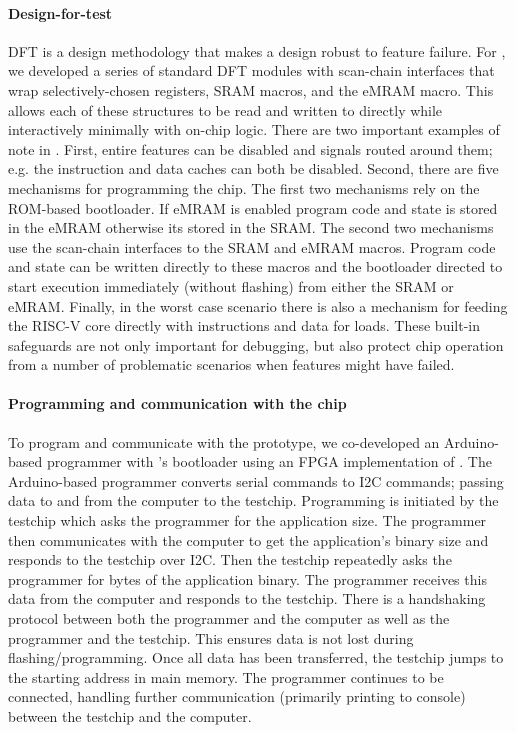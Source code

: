 \paragraph{Design-for-test}
DFT is a design methodology that makes a design robust to feature failure.
% 
For \msilicon, we developed a series of standard DFT modules with scan-chain interfaces that wrap selectively-chosen registers, SRAM macros, and the eMRAM macro.
% 
This allows each of these structures to be read and written to directly while interactively minimally with on-chip logic.
% 
There are two important examples of note in \msilicon.
% 
First, entire features can be disabled and signals routed around them; e.g. the instruction and data caches can both be disabled.
% 
Second, there are five mechanisms for programming the chip.
% 
The first two mechanisms rely on the ROM-based bootloader.
% 
If eMRAM is enabled program code and state is stored in the eMRAM otherwise its stored in the SRAM.
% 
The second two mechanisms use the scan-chain interfaces to the SRAM and eMRAM macros.
% 
Program code and state can be written directly to these macros and the bootloader directed to start execution immediately (without flashing) from either the SRAM or eMRAM.
% 
Finally, in the worst case scenario there is also a mechanism for feeding the RISC-V core directly with instructions and data for loads.
% 
These built-in safeguards are not only important for debugging, but also protect chip operation from a number of problematic scenarios when features might have failed.

\paragraph{Programming and communication with the chip} 
To program and communicate with the \msilicon prototype, we co-developed an Arduino-based programmer with \msilicon's bootloader using an FPGA implementation of \msilicon.
% 
The Arduino-based programmer converts serial commands to I2C commands; passing data to and from the computer to the testchip.
% 
Programming is initiated by the testchip which asks the programmer for the application size.
% 
The programmer then communicates with the computer to get the application's binary size and responds to the testchip over I2C.
% 
Then the testchip repeatedly asks the programmer for bytes of the application binary.
% 
The programmer receives this data from the computer and responds to the testchip.
% 
There is a handshaking protocol between both the programmer and the computer as well as the programmer and the testchip.
% 
This ensures data is not lost during flashing/programming.
% 
Once all data has been transferred, the testchip jumps to the starting address in main memory.
% 
The programmer continues to be connected, handling further communication (primarily printing to console) between the testchip and the computer.

